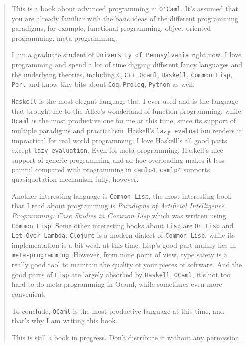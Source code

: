 \begin{quotation}

  This is a book about advanced programming in \verb|O'Caml|.  It's
  assumed that you are already familiar with the basic ideas of the
  different programming paradigms, for example, functional
  programming, object-oriented programming, meta programming.

  I am a graduate student of \verb|University of Pennsylvania| right
  now. I love programming and spend a lot of time digging different
  fancy languages and the underlying theories, including \verb|C|,
  \verb|C++|, \verb|Ocaml|, \verb|Haskell|, \verb|Common Lisp|,
  \verb|Perl| and know tiny bits about \verb|Coq|, \verb|Prolog|,
  \verb|Python| as well.

  \verb|Haskell| is the most elegant language that I ever used and is
  the language that brought me to the Alice's wonderland of function
  programming, while \verb|Ocaml| is the most productive one for me at
  this time, since its support of multiple paradigms and
  practicalism. Haskell's \verb|lazy evaluation| renders it
  impractical for real world programming. I love Haskell's all good
  parts except \verb|lazy evaluation|. Even for meta-programming,
  Haskell's nice support of generic programming and ad-hoc overloading
  makes it less painful compared with programming in \verb|camlp4|,
  \verb|camlp4| supports quasiquotation mechanism fully, however.

  Another interesting language is \verb|Common Lisp|, the most
  interesting book that I read about programming is \textit{Paradigms
    of Artificial Intelligence Programming: Case Studies in Common
    Lisp} which was written using \verb|Common Lisp|. Some other
  interesting books about \verb|Lisp| are \verb|On Lisp| and
  \verb|Let Over Lambda|. \verb|Clojure| is a modern dialect of
  \verb|Common Lisp|, while its implementation is a bit weak at this
  time. Lisp's good part mainly lies in \verb|meta-programming|.
  However, from mine point of view, type safety is a really good tool
  to maintain the quality of your pieces of software. And the good
  parts of \verb|Lisp| are largely absorbed by \verb|Haskell|,
  \verb|OCaml|, it's not too hard to do meta programming in Ocaml,
  while sometimes even more convenient.


  To conclude, \verb|OCaml| is the most productive language at this
  time, and that's why I am writing this book.

  
  This is still a book in progress. Don't distribute it without any
  permission.
\end{quotation}
